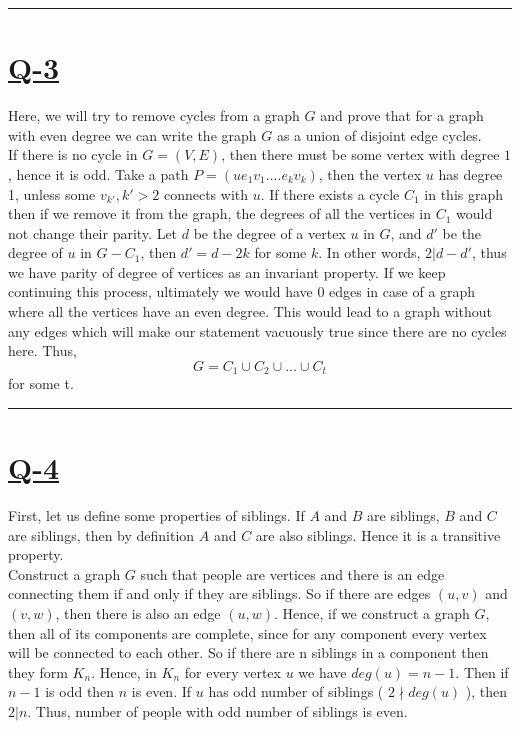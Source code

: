 \documentclass[14pt]{article}
\begin{document}
	\vspace{2cm}
	\hrule
	\vspace{0.5cm}
		
	\section*{\underline{Q-3}}
		\noindent
		\linebreak
		Here, we will try to remove cycles from a graph $G$ and prove that for a graph with even degree we can write the graph $G$ as a union of disjoint edge cycles. \\
		\linebreak
		If there is no cycle in $G = (V, E)$, then there must be some vertex with degree $1$, hence it is odd. Take a path $P = (ue_{1}v_{1}....e_{k}v_{k})$, then the vertex $u$ has degree 1, unless some $v_{k'}, k'>2$ connects with $u$. If there exists a cycle $C_1$ in this graph then if we remove it from the graph, the degrees of all the vertices in $C_1$ would not change their parity. Let $d$ be the degree of a vertex $u$ in $G$, and $d'$ be the degree of $u$ in $G-C_1$, then $d' = d - 2k$ for some $k$. In other words, $2 | d-d'$, thus we have parity of degree of vertices as an invariant property. If we keep continuing this process, ultimately we would have 0 edges in case of a graph where all the vertices have an even degree. This would lead to a graph without any edges which will make our statement vacuously true since there are no cycles here. Thus,
		$$ G = C_1 \cup C_2 \cup \dots \cup C_t $$ for some t.   
	
	\vspace{2cm}
	\hrule
	\vspace{0.5cm}
	
	\section*{\underline{Q-4}}
		\noindent
		\linebreak
		First, let us define some properties of siblings. If $A$ and $B$ are siblings, $B$ and $C$ are siblings, then by definition $A$ and $C$ are also siblings. Hence it is a transitive property. \\
		\linebreak
		Construct a graph $G$ such that people are vertices and there is an edge connecting them if and only if they are siblings. So if there are edges $(u, v)$ and $(v, w)$, then there is also an edge $(u, w)$. Hence, if we construct a graph $G$, then all of its components are complete, since for any component every vertex will be connected to each other. So if there are n siblings in a component then they form $K_n$. Hence, in $K_n$ for every vertex $u$ we have $deg(u) = n-1$. Then if $n-1$ is odd then $n$ is even. If $u$ has odd number of siblings ( $2 \nmid deg(u)$ ), then $2 | n$. Thus, number of people with odd number of siblings is even.
	
\end{document}
